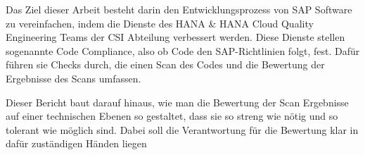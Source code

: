 \documentclass[../main.tex]{subfiles}
\begin{document}
Das Ziel dieser Arbeit besteht darin den Entwicklungsprozess von SAP Software zu vereinfachen, indem die Dienste des HANA \& HANA Cloud Quality Engineering Teams der \gls{CSI} Abteilung verbessert werden.
Diese Dienste stellen sogenannte Code Compliance, also ob Code den SAP-Richtlinien folgt, fest. Dafür führen sie Checks durch, die einen Scan des Codes und die Bewertung der Ergebnisse des Scans umfassen. 

Dieser Bericht baut darauf hinaus, wie man die Bewertung der Scan Ergebnisse auf einer technischen Ebenen so gestaltet, dass sie so streng wie nötig und so tolerant wie möglich sind.
Dabei soll die Verantwortung für die Bewertung klar in dafür zuständigen Händen liegen
\end{document}
